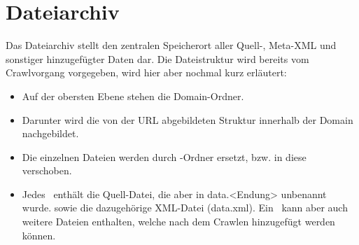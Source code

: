 \section{Dateiarchiv} \label{spec:filearchive}
Das Dateiarchiv stellt den zentralen Speicherort aller Quell-, Meta-XML und sonstiger
hinzugefügter Daten dar.
Die Dateistruktur wird bereits vom Crawlvorgang vorgegeben, wird hier aber nochmal kurz erläutert:
\begin{itemize}
	\item Auf der obersten Ebene stehen die Domain-Ordner.
	\item Darunter wird die von der URL abgebildeten Struktur
		innerhalb der Domain nachgebildet.
	\item Die einzelnen Dateien werden durch \arc-Ordner ersetzt, bzw. in diese verschoben.
	\item Jedes \arc\ enthält die Quell-Datei, 
		die aber in data.<Endung> unbenannt wurde.
		sowie die dazugehörige XML-Datei (data.xml). 
		Ein \arc\ kann aber auch weitere Dateien enthalten, welche nach dem
		Crawlen hinzugefügt werden können.
\end{itemize}
